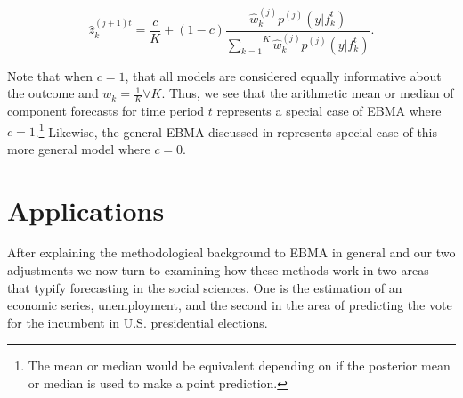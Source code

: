 \documentclass[12pt,fullpage,endnotes]{article}
\begin{document}
\begin{equation}
\hat{z}^{(j+1)t}_{k} = \frac{c}{K} + (1-c)\frac{\hat{w}^{(j)}_k
p^{(j)}(y|f_{k}^{t})}{\overset{K}{\underset{k=1}{\sum}}\hat{w}^{(j)}_kp^{(j)}(y|f_{k}^{t})}.
\end{equation}




Note that when $c=1$, that all models are considered equally
informative about the outcome and $w_k=\frac{1}{K} \forall K$. Thus, we see that the arithmetic mean or
median of component forecasts for time period $t$ represents a special
case of EBMA where $c=1$.\footnote{The mean or median would be
  equivalent depending on if the posterior mean or median is used to
  make a point prediction.}  Likewise, the general EBMA discussed in
\citet{mhw:2012} represents special case of this more general
model where $c=0$.


\section{Applications}
\label{empirics}
After explaining the methodological background to EBMA in general and our two adjustments we now turn to examining how these methods work in two areas that typify forecasting in
the social sciences. One is the estimation of an economic series, unemployment, and the second in the area of predicting the vote for the incumbent in U.S. presidential elections.
\end{document}
